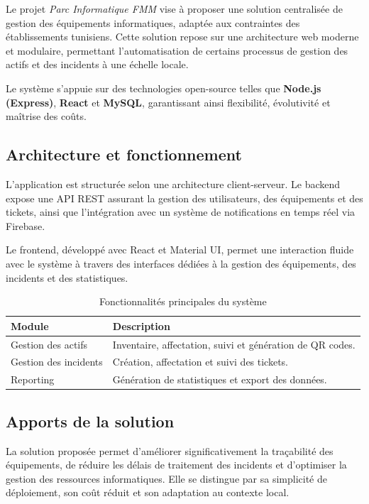 Le projet \textit{Parc Informatique FMM} vise à proposer une solution centralisée de gestion des équipements informatiques, adaptée aux contraintes des établissements tunisiens. Cette solution repose sur une architecture web moderne et modulaire, permettant l’automatisation de certains processus de gestion des actifs et des incidents à une échelle locale.

Le système s’appuie sur des technologies open-source telles que \textbf{Node.js (Express)}\cite{expressjs2024}, \textbf{React}\cite{react2024} et \textbf{MySQL}\cite{mysql2024}, garantissant ainsi flexibilité, évolutivité et maîtrise des coûts.

\subsection{Architecture et fonctionnement}

L’application est structurée selon une architecture client-serveur. Le backend expose une API REST assurant la gestion des utilisateurs, des équipements et des tickets, ainsi que l’intégration avec un système de notifications en temps réel via Firebase\cite{firebase2024}.

Le frontend, développé avec React et Material UI\cite{materialui2024}, permet une interaction fluide avec le système à travers des interfaces dédiées à la gestion des équipements, des incidents et des statistiques.

\begin{table}[H]
\centering
\caption{Fonctionnalités principales du système}
\label{tab:domaines_parc_informatique}
\begin{tabular}{|l|p{10cm}|}
\hline
\textbf{Module} & \textbf{Description} \\ \hline
Gestion des actifs & Inventaire, affectation, suivi et génération de QR codes. \\ \hline
Gestion des incidents & Création, affectation et suivi des tickets. \\ \hline
Reporting & Génération de statistiques et export des données. \\ \hline
\end{tabular}
\end{table}

\subsection{Apports de la solution}

La solution proposée permet d’améliorer significativement la traçabilité des équipements, de réduire les délais de traitement des incidents et d’optimiser la gestion des ressources informatiques. Elle se distingue par sa simplicité de déploiement, son coût réduit et son adaptation au contexte local.

